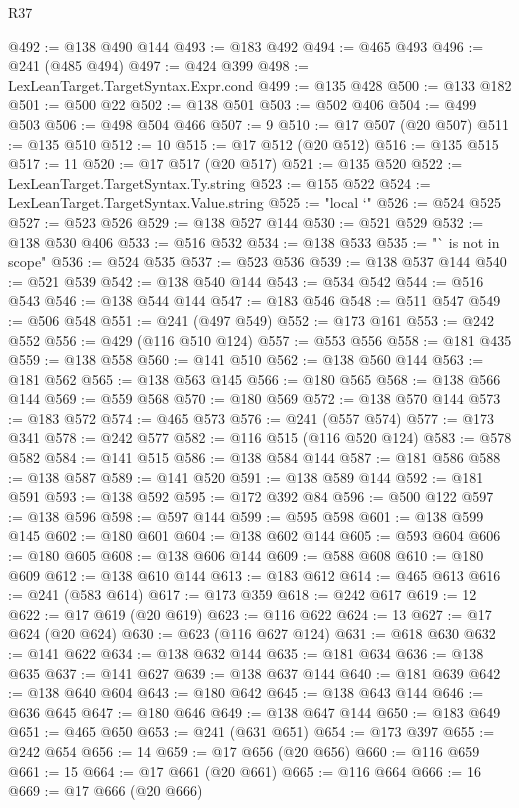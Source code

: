 \begin{lexlean}{R37}
\begin{coremodule}
@492 := @138 @490 @144
@493 := @183 @492
@494 := @465 @493
@496 := @241 (@485 @494)
@497 := @424 @399
@498 := LexLeanTarget.TargetSyntax.Expr.cond
@499 := @135 @428
@500 := @133 @182
@501 := @500 @22
@502 := @138 @501
@503 := @502 @406
@504 := @499 @503
@506 := @498 @504 @466
@507 := 9
@510 := @17 @507 (@20 @507)
@511 := @135 @510
@512 := 10
@515 := @17 @512 (@20 @512)
@516 := @135 @515
@517 := 11
@520 := @17 @517 (@20 @517)
@521 := @135 @520
@522 := LexLeanTarget.TargetSyntax.Ty.string
@523 := @155 @522
@524 := LexLeanTarget.TargetSyntax.Value.string
@525 := "local `"
@526 := @524 @525
@527 := @523 @526
@529 := @138 @527 @144
@530 := @521 @529
@532 := @138 @530 @406
@533 := @516 @532
@534 := @138 @533
@535 := "` is not in scope"
@536 := @524 @535
@537 := @523 @536
@539 := @138 @537 @144
@540 := @521 @539
@542 := @138 @540 @144
@543 := @534 @542
@544 := @516 @543
@546 := @138 @544 @144
@547 := @183 @546
@548 := @511 @547
@549 := @506 @548
@551 := @241 (@497 @549)
@552 := @173 @161
@553 := @242 @552
@556 := @429 (@116 @510 @124)
@557 := @553 @556
@558 := @181 @435
@559 := @138 @558
@560 := @141 @510
@562 := @138 @560 @144
@563 := @181 @562
@565 := @138 @563 @145
@566 := @180 @565
@568 := @138 @566 @144
@569 := @559 @568
@570 := @180 @569
@572 := @138 @570 @144
@573 := @183 @572
@574 := @465 @573
@576 := @241 (@557 @574)
@577 := @173 @341
@578 := @242 @577
@582 := @116 @515 (@116 @520 @124)
@583 := @578 @582
@584 := @141 @515
@586 := @138 @584 @144
@587 := @181 @586
@588 := @138 @587
@589 := @141 @520
@591 := @138 @589 @144
@592 := @181 @591
@593 := @138 @592
@595 := @172 @392 @84
@596 := @500 @122
@597 := @138 @596
@598 := @597 @144
@599 := @595 @598
@601 := @138 @599 @145
@602 := @180 @601
@604 := @138 @602 @144
@605 := @593 @604
@606 := @180 @605
@608 := @138 @606 @144
@609 := @588 @608
@610 := @180 @609
@612 := @138 @610 @144
@613 := @183 @612
@614 := @465 @613
@616 := @241 (@583 @614)
@617 := @173 @359
@618 := @242 @617
@619 := 12
@622 := @17 @619 (@20 @619)
@623 := @116 @622
@624 := 13
@627 := @17 @624 (@20 @624)
@630 := @623 (@116 @627 @124)
@631 := @618 @630
@632 := @141 @622
@634 := @138 @632 @144
@635 := @181 @634
@636 := @138 @635
@637 := @141 @627
@639 := @138 @637 @144
@640 := @181 @639
@642 := @138 @640 @604
@643 := @180 @642
@645 := @138 @643 @144
@646 := @636 @645
@647 := @180 @646
@649 := @138 @647 @144
@650 := @183 @649
@651 := @465 @650
@653 := @241 (@631 @651)
@654 := @173 @397
@655 := @242 @654
@656 := 14
@659 := @17 @656 (@20 @656)
@660 := @116 @659
@661 := 15
@664 := @17 @661 (@20 @661)
@665 := @116 @664
@666 := 16
@669 := @17 @666 (@20 @666)

\end{coremodule}
\end{lexlean}

